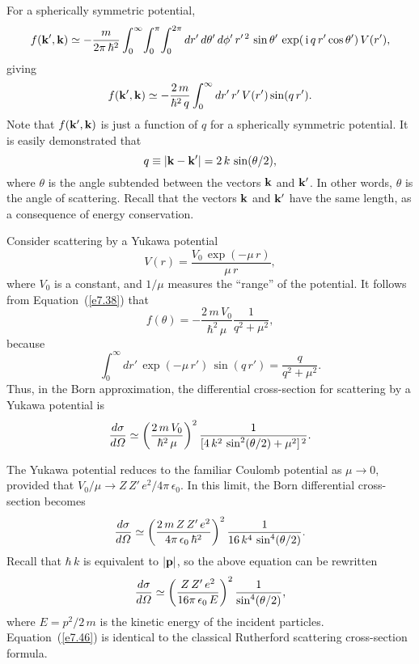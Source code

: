 For a spherically symmetric potential, 
\begin{equation}
f({\bf k}', {\bf k}) \simeq  - \frac{m}{2\pi\, \hbar^2} \int_0^\infty\!\int_0^\pi\!\int_0^{2\pi} dr' \,d\theta'\,d\phi'\,r'^{\,2}\,\sin\theta'
\,\exp(\,{\rm i} \, q \,r'\cos\theta') \, V(r'),
\end{equation}
giving
\begin{equation}\label{e7.38}
f({\bf k}', {\bf k}) \simeq  - \frac{2\,m}{\hbar^2\,q}
\int_0^\infty  dr'\,r' \,V(r') \sin(q \,r').
\end{equation}
Note that $f({\bf k}', {\bf k})$ is just a function of $q$ for a
spherically symmetric potential.
It is easily demonstrated that
\begin{equation}
q \equiv |{\bf k} - {\bf k}'| = 2\, k \,\sin (\theta/2),
\end{equation}
where $\theta$ is the angle subtended between the vectors
${\bf k}$ and ${\bf k}'$. In other words, $\theta$ is the angle of
scattering. Recall that the
vectors ${\bf k}$ and ${\bf k}'$ have the same length, as a consequence of  energy conservation.

Consider scattering by a Yukawa potential
\begin{equation}
V(r) = \frac{V_0\,\exp(-\mu \,r)}{\mu \,r},
\end{equation}
where $V_0$ is a constant, and $1/\mu$ measures the ``range'' of the
potential. It follows from Equation~(\ref{e7.38}) that
\begin{equation}
f(\theta) = - \frac{2\,m \,V_0}{\hbar^2\,\mu} \frac{1}{q^2 + \mu^2},
\end{equation}
because 
\begin{equation}
\int_0^\infty  dr'\, \exp(-\mu \,r') \,\sin(q\,r') = \frac{q}{q^2+\mu^2}.
\end{equation}
Thus, in the Born approximation, the differential cross-section
for scattering by a Yukawa potential is
\begin{equation}
\frac{d\sigma}{d {\mit\Omega}} \simeq \left(\frac{2\,m \,V_0}{ \hbar^2\,\mu}\right)^2
\frac{1}{[4\,k^2\,\sin^2(\theta/2) + \mu^2]^{\,2}}.
\end{equation}

The Yukawa potential reduces to the familiar Coulomb potential as
$\mu \rightarrow 0$, provided that $V_0/\mu \rightarrow
Z\,Z'\, e^2 / 4\pi\,\epsilon_0$. In this limit, the Born differential cross-section becomes
\begin{equation}
\frac{d\sigma}{d{\mit\Omega}} \simeq \left(\frac{2\,m \,Z\, Z'\, e^2}{4\pi\,\epsilon_0\,\hbar^2}\right)^2
\frac{1}{ 16 \,k^4\, \sin^4( \theta/2)}.
\end{equation}
Recall that $\hbar\, k$ is equivalent to $|{\bf p}|$, so the above
equation can be rewritten 
\begin{equation}\label{e7.46}
 \frac{d\sigma}{d{\mit\Omega}} \simeq\left(\frac{Z \,Z'\, e^2}{16\pi\,\epsilon_0\,E}\right)^2
\frac{1}{\sin^4(\theta/2)},
\end{equation}
where $E= p^2/2\,m$ is the kinetic energy of the incident particles. 
Equation~(\ref{e7.46}) is identical to the classical Rutherford scattering cross-section formula.

